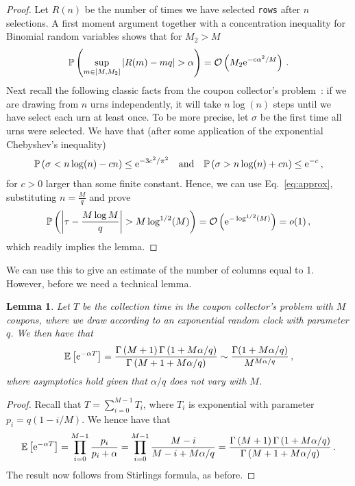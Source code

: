\documentclass{article}
\numberwithin{equation}{section}
\newcommand{\ek}[1]{\left[#1\right]}
\newcommand{\rk}[1]{\left(#1\right)}
\newcommand{\abs}[1]{\left| #1 \right|}
\newcommand{\Ocal}   {{\mathcal O }}
\renewcommand{\P}   {\mathbb{P}}
\newcommand{\E}     {\mathbb{E}}
\newcommand{\ex}{{\rm e}}
\newcommand{\1}{\mathbbm{1}}
\renewcommand{\P}{\mathbb{P}}
\newtheorem{lemma}{Lemma}[section]
\begin{document}
\begin{proof}
    Let $R(n)$ be the number of times we have selected \texttt{rows} after $n$ selections. A first moment argument together with a concentration inequality for Binomial random variables shows that for $M_2>M$
    \begin{equation}\label{eq:approx}
        \P\rk{\sup_{m\in \ek{M,M_2}}\abs{R(m)-mq}>\alpha}=\Ocal\rk{ M_2\ex^{-c\alpha^2/M}}\, .
    \end{equation}
    Next recall the following classic facts from the coupon collector's problem~\cite[Sec 3.3.1]{mitzenmacher2017probability}: if we are drawing from $n$ urns independently, it will take $n\log(n)$ steps until we have select each urn at least once. To be more precise, let $\sigma$ be the first time all urns were selected. We have that (after some application of the exponential Chebyshev's inequality)
    \begin{equation}\label{eq:uppertails313251}
        \P\rk{\sigma<n\log(n)-c n}\le \ex^{-3c^2/\pi^2}\quad\text{and}\quad \P\rk{\sigma>n\log(n)+c n}\le \ex^{-c}\, ,
    \end{equation}
    for $c>0$ larger than some finite constant. Hence, we can use Eq.~\eqref{eq:approx}, substituting $n=\tfrac{M}{q}$ and prove 
    \begin{equation}
        \P\rk{\abs{\tau-\frac{M\log M}{q}}>M\log^{1/2}(M)}=\Ocal\rk{\ex^{-\log^{1/2}(M)}}=o(1)\, ,
    \end{equation}
    which readily implies the lemma.
\end{proof}
We can use this to give an estimate of the number of columns equal to 1. However, before we need a technical lemma.
\begin{lemma}\label{lem:technical}
    Let $T$ be the collection time in the coupon collector's problem with $M$ coupons, where we draw according to an exponential random clock with parameter $q$. We then have that
    \begin{equation}
        \E\ek{\ex^{-\alpha T}}=\frac{\Gamma\rk{M+1}\Gamma\rk{1+M\alpha/q}}{\Gamma\rk{M+1+M\alpha/q}}\sim \frac{\Gamma(1+M\alpha/q)}{M^{M\alpha/q}}\, ,
    \end{equation}
    where asymptotics hold given that $\alpha/q$ does not vary with $M$.
\end{lemma}
\begin{proof}
    Recall that $T=\sum_{i=0}^{M-1}T_i$, where $T_i$ is exponential with parameter $p_i=q(1-i/M)$. We hence have that
    \begin{equation}
        \E\ek{\ex^{-\alpha T}}=\prod_{i=0}^{M-1}\frac{p_i}{p_i+\alpha}=\prod_{i=0}^{M-1}\frac{M-i}{M-i+M\alpha/q}=\frac{\Gamma\rk{M+1}\Gamma\rk{1+M\alpha/q}}{\Gamma\rk{M+1+M\alpha/q}}\, .
    \end{equation}
   The result now follows from Stirlings formula, as before.
\end{proof}
\end{document}
